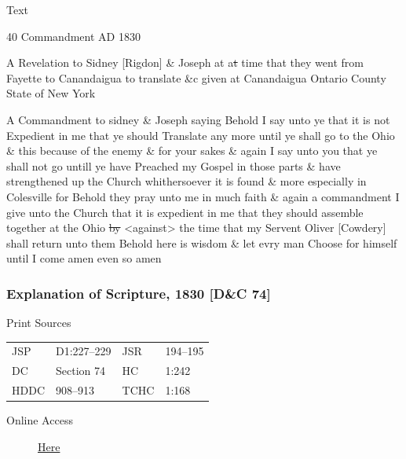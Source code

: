 			\begin{description}
				\item[Text]
			\end{description}
			
				\begin{tightcenter}
				40 Commandment AD 1830
				\end{tightcenter}
				
				A Revelation to Sidney [Rigdon] \& Joseph at a\sout{t} time that they went from Fayette to Canandaigua to translate \&c given at Canandaigua Ontario County State of New York
				
				A Commandment to sidney \& Joseph saying Behold I say unto ye that it is not Expedient in me that ye should Translate any more until ye shall go to the Ohio \& this because of the enemy \& for your sakes \& again I say unto you that ye shall not go untill ye have Preached my Gospel in those parts \& have strengthened up the Church whithersoever it is found \& more especially in Colesville for Behold they pray unto me in much faith \& again a commandment I give unto the Church that it is expedient in me that they should assemble together at the Ohio \sout{by} <against> the time that my Servent Oliver [Cowdery] shall return unto them Behold here is wisdom \& let evry man Choose for himself until I come amen even so amen
				
		\subsubsection{Explanation of Scripture, 1830 [D\&C 74]}
			\label{EMS-1830-JS-1830}
		
			\begin{description}
				\item[Print Sources]
			\end{description}

				\begin{tabular}{p{0.5in}p{1in}p{0.5in}p{1in}}
				JSP	 	& D1:227--229	& JSR 		& 194--195 \\
				DC	 	& Section 74	& HC 		& 1:242 \\
				HDDC 	& 908--913		& TCHC 		& 1:168 \\
				\end{tabular}
			
			\begin{description}
				\item[Online Access] \href{https://www.josephsmithpapers.org/paper-summary/explanation-of-scripture-1830-dc-74/1}{Here}
			\end{description}
			
